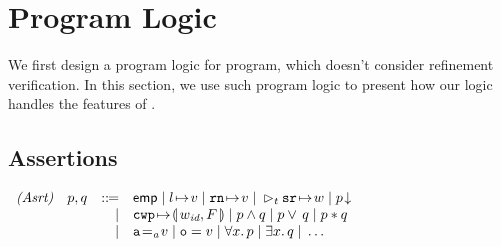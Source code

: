 \section{Program Logic}
\label{sec:logic}

We first design a program logic for \sparc{} program, 
which doesn't consider refinement verification. 
In this section, we use such program logic to present 
how our logic handles the features of \sparc{}. 


\subsection{Assertions}
\label{subsec:assertions}

\begin{center}
	$
		\begin{array}{rrcl}
			\textit{(Asrt)} & \astP, \astQ & \define & 
			\aemp \sepline
			\msto{l}{\val} \sepline
			\regst{\regN}{\val} \sepline
			\dlyregst{t}{\sr}{\word} \sepline 
			\asrttm{p} \\
			& & \ \ \ | &
			\frmst{\cwp}{F} \sepline
			\astP \wedge \astQ \sepline
			\astP \vee \, \astQ \sepline
			\astP \sepstar \astQ \\
			& & \ \ \ | &
			\aexp \addrEq \val \sepline
			\oexp = \val \sepline
			\forall x. \, \astP \sepline
			\exists x. \, \astQ \sepline
            \dots 
		\end{array}
	$
	\label{fig:Syntax of Assertions}
	\vspace{-0.5em}
\end{center}



